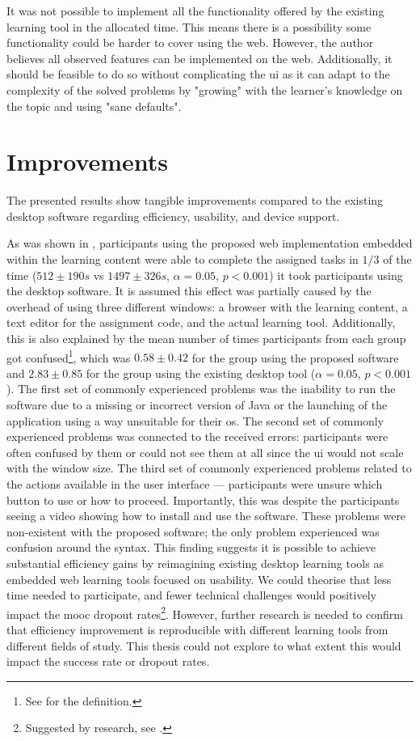 {It was not possible to implement all the functionality offered by the existing learning tool in the allocated time.
This means there is a possibility some functionality could be harder to cover using the web.
However, the author believes all observed features can be implemented on the web.
Additionally, it should be feasible to do so without complicating the \gls{ui} as it can adapt to the complexity of the solved problems by "growing" with the learner's knowledge on the topic and using "sane defaults".

\section{Improvements}

The presented results show tangible improvements compared to the existing desktop software regarding efficiency, usability, and device support.

As was shown in , participants using the proposed web implementation embedded within the learning content were able to complete the assigned tasks in $1/3$ of the time ($512 \pm190 s$ vs $1497 \pm326 s$, $\alpha=0.05$, $p<0.001$) it took participants using the desktop software.
It is assumed this effect was partially caused by the overhead of using three different windows: a browser with the learning content, a text editor for the assignment code, and the actual learning tool.
Additionally, this is also explained by the mean number of times participants from each group got confused\footnote{See  for the definition.}, which was $0.58 \pm 0.42$ for the group using the proposed software and $2.83 \pm 0.85$ for the group using the existing desktop tool ($\alpha=0.05$, $p<0.001$).
The first set of commonly experienced problems was the inability to run the software due to a missing or incorrect version of Java or the launching of the application using a way unsuitable for their \gls{os}.
The second set of commonly experienced problems was connected to the received errors: participants were often confused by them or could not see them at all since the \gls{ui} would not scale with the window size.
The third set of commonly experienced problems related to the actions available in the user interface --- participants were unsure which button to use or how to proceed.
Importantly, this was despite the participants seeing a video showing how to install and use the software.
These problems were non-existent with the proposed software; the only problem experienced was confusion around the syntax.
This finding suggests it is possible to achieve substantial efficiency gains by reimagining existing desktop learning tools as embedded web learning tools focused on usability.
We could theorise that less time needed to participate, and fewer technical challenges would positively impact the \gls{mooc} dropout rates\footnote{Suggested by research, see .}.
However, further research is needed to confirm that efficiency improvement is reproducible with different learning tools from different fields of study.
This thesis could not explore to what extent this would impact the success rate or dropout rates.

}
